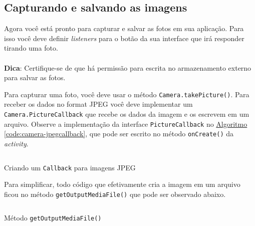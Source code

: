 \documentclass[a4paper,12pt,brazil,oneside]{book}
\begin{document}
\begin{singlespace}
	\newpage

	\subsection{Capturando e salvando as imagens}
		Agora você está pronto para capturar e salvar as fotos em sua aplicação. Para isso você deve definir \emph{listeners} para o botão da sua interface que irá responder tirando uma foto.

\begin{framed}
\paragraph{}\textbf{Dica}: Certifique-se de que há permissão para escrita no armazenamento externo para salvar as fotos.
\textit{}
\end{framed}

		Para capturar uma foto, você deve usar o método \texttt{Camera.takePicture()}. Para receber os dados no format JPEG você deve implementar um \texttt{Camera.PictureCallback} que recebe os dados da imagem e os escrevem em um arquivo. Observe a implementação da interface \texttt{PictureCallback} no \hyperref[code:camera-jpegcallback]{Algoritmo \ref*{code:camera-jpegcallback}}, que pode ser escrito no método \texttt{onCreate()} da \emph{activity}.

		\begin{listing}[H]
		\inputminted[linenos=true,fontsize=\small,frame=lines, framesep=2mm, tabsize=2,numbersep=5pt]{java}{src/api/camera/jpegcallback.java}
		\caption{Criando um \texttt{Callback} para imagens JPEG}
		\label{code:camera-jpegcallback}
		\end{listing} 			

		Para simplificar, todo código que efetivamente cria a imagem em um arquivo ficou no método \texttt{getOutputMediaFile()} que pode ser observado abaixo.

		\begin{listing}[H]
		\inputminted[linenos=true,fontsize=\small,frame=lines, framesep=2mm, tabsize=2,numbersep=5pt]{java}{src/api/camera/getoutputmediafile.java}
		\caption{Método \texttt{getOutputMediaFile()}}
		\label{code:camera-getoutput}
		\end{listing} 			


\end{singlespace}
\end{document}
